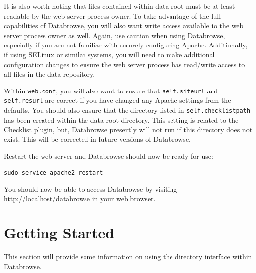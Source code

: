 \documentclass[10pt]{article}
\begin{document}
It is also worth noting that files contained within data root must be at least readable by the web server process owner.  To take advantage of the full capabilities of Databrowse, you will also want write access available to the web server process owner as well.  Again, use caution when using Databrowse, especially if you are not familiar with securely configuring Apache.  Additionally, if using SELinux or similar systems, you will need to make additional configuration changes to ensure the web server process has read/write access to all files in the data repository.

Within \texttt{web.conf}, you will also want to ensure that \texttt{self.siteurl} and \texttt{self.resurl} are correct if you have changed any Apache settings from the defaults.  You should also ensure that the directory listed in \texttt{self.checklistpath} has been created within the data root directory.  This setting is related to the Checklist plugin, but, Databrowse presently will not run if this directory does not exist.  This will be corrected in future versions of Databrowse.

Restart the web server and Databrowse should now be ready for use:

\begin{verbatim}
sudo service apache2 restart
\end{verbatim}

You should now be able to access Databrowse by visiting \url{http://localhost/databrowse} in your web browser.

\clearpage
\section{Getting Started}\label{GettingStarted}

This section will provide some information on using the directory interface within Databrowse.
\end{document}
